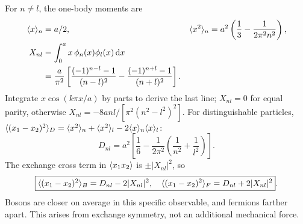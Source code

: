 For $n\ne l$, the one-body moments are
\begin{align}
\langle x\rangle_n&=a/2,&
\langle x^2\rangle_n&=a^2\left(\frac13-\frac1{2\pi^2n^2}\right),\\
X_{nl}&=\int_0^a x\,\phi_n(x)\phi_l(x)\,\mathrm d x\\
&=\frac{a}{\pi^2}\left[
\frac{(-1)^{n-l}-1}{(n-l)^2}
-\frac{(-1)^{n+l}-1}{(n+l)^2}\right].
\end{align}
Integrate $x\cos(k\pi x/a)$ by parts to
derive the last line; $X_{nl}=0$ for equal
parity, otherwise
$X_{nl}=-8anl/[\pi^2(n^2-l^2)^2]$.
For distinguishable particles,
$\langle (x_1-x_2)^2\rangle_{D}=
\langle x^2\rangle_n+\langle x^2\rangle_l-2\langle x\rangle_n\langle x\rangle_l$:
\begin{equation}
\boxed{D_{nl}=a^2\left[
\frac16-\frac1{2\pi^2}
\left(\frac1{n^2}+\frac1{l^2}\right)\right]}.
\end{equation}
The exchange cross term in
$\langle x_1x_2\rangle$ is $\pm|X_{nl}|^2$,
so
\begin{equation}
\boxed{\langle (x_1-x_2)^2\rangle_{B}=D_{nl}-2|X_{nl}|^2,\quad
\langle (x_1-x_2)^2\rangle_{F}=D_{nl}+2|X_{nl}|^2}.
\end{equation}
Bosons are closer on average in this
specific observable, and fermions farther apart.
This arises from exchange symmetry,
not an additional mechanical force.


